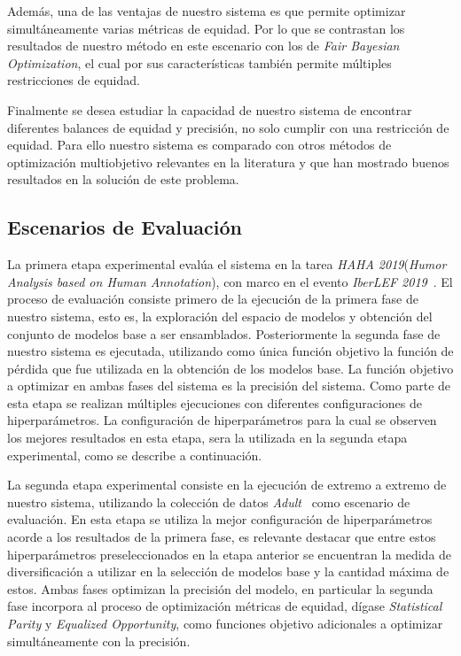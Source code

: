 Además, una de las ventajas de nuestro sistema es que permite optimizar simultáneamente varias métricas de equidad.
Por lo que se contrastan los resultados de nuestro método en este escenario con los de \emph{Fair Bayesian Optimization}, el cual por sus características también permite múltiples restricciones de equidad.

Finalmente se desea estudiar la capacidad de nuestro sistema de encontrar diferentes balances de equidad y precisión, no solo cumplir con una restricción de equidad.
Para ello nuestro sistema es comparado con otros métodos de optimización multiobjetivo relevantes en la literatura y que han mostrado buenos resultados en la solución de este problema.

\subsection{Escenarios de Evaluación}\label{section:evaluation-scenaries}

La primera etapa experimental evalúa el sistema en la tarea \emph{HAHA 2019}(\textit{Humor Analysis based on Human Annotation}), con marco en el evento \textit{IberLEF 2019}~\parencite{chiruzzo2019overview}.
El proceso de evaluación consiste primero de la ejecución de la primera fase de nuestro sistema, esto es, la exploración del espacio de modelos y obtención del conjunto de modelos base a ser ensamblados.
Posteriormente la segunda fase de nuestro sistema es ejecutada, utilizando como única función objetivo la función de pérdida que fue utilizada en la obtención de los modelos base.
La función objetivo a optimizar en ambas fases del sistema es la precisión del sistema.
Como parte de esta etapa se realizan múltiples ejecuciones con diferentes configuraciones de hiperparámetros.
La configuración de hiperparámetros para la cual se observen los mejores resultados en esta etapa, sera la utilizada en la segunda etapa experimental, como se describe a continuación.

La segunda etapa experimental consiste en la ejecución de extremo a extremo de nuestro sistema, utilizando la colección de datos \emph{Adult}~\parencite{ucidata} como escenario de evaluación.
En esta etapa se utiliza la mejor configuración de hiperparámetros acorde a los resultados de la primera fase, es relevante destacar que entre estos hiperparámetros preseleccionados en la etapa anterior se encuentran la medida de diversificación a utilizar en la selección de modelos base y la cantidad máxima de estos.
Ambas fases optimizan la precisión del modelo, en particular la segunda fase incorpora al proceso de optimización métricas de equidad, dígase \emph{Statistical Parity} y \emph{Equalized Opportunity}, como funciones objetivo adicionales a optimizar simultáneamente con la precisión.

